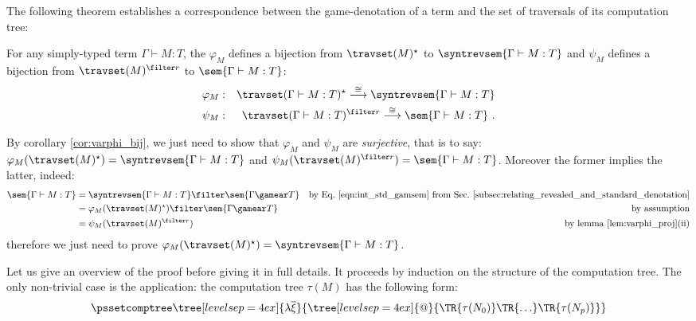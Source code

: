 The following theorem establishes a correspondence between the
game-denotation of a term and the set of traversals of its
computation tree:
\begin{theorem}
\label{thm:correspondence}
 For any simply-typed term $\Gamma \vdash M :T$,
the $\varphi_M$ defines a bijection from $\travset(M)^\star$ to $\syntrevsem{\Gamma \vdash M : T}$ and $\psi_M$ defines a bijection from $\travset(M)^{\filter
r}$ to $\sem{\Gamma \vdash M : T}$:
\begin{eqnarray*}
 \varphi_M  &:& \travset(\Gamma \vdash M : T)^\star \stackrel{\cong}{\longrightarrow} \syntrevsem{\Gamma \vdash M :T} \\
 \psi_M  &:& \travset(\Gamma \vdash M : T)^{\filter r} \stackrel{\cong}{\longrightarrow} \sem{\Gamma \vdash M :T} \ .
\end{eqnarray*}
\end{theorem}

\begin{remark}
\label{rem:corresp_proofreduction}
    By corollary \ref{cor:varphi_bij}, we just need to show that
    $\varphi_M$ and $\psi_M$ are \emph{surjective}, that is to
    say: $\varphi_M(\travset(M)^\star) = \syntrevsem{\Gamma \vdash M : T}$
    and $\psi_M(\travset(M)^{\filter r}) = \sem{\Gamma \vdash M : T}$.
    Moreover the former implies the latter, indeed:
    \begin{align*}
    \sem{\Gamma \vdash M : T} &= \syntrevsem{\Gamma \vdash M : T} \filter \sem{\Gamma \gamear T} & \mbox{by Eq.\ \ref{eqn:int_std_gamsem} from Sec.\ \ref{subsec:relating_revealed_and_standard_denotation}} \\
            &= \varphi_M(\travset(M)^\star) \filter \sem{\Gamma \gamear T} & \mbox{by assumption}\\
            &= \psi_M(\travset(M)^{\filter r}) & \mbox{by lemma \ref{lem:varphi_proj}(ii)}
    \end{align*}
    therefore we just need to prove $\varphi_M(\travset(M)^\star) = \syntrevsem{\Gamma \vdash M : T}$.
\end{remark}
\smallskip

    Let us give an overview of the proof before giving it in full details.
    It proceeds by induction on the structure of the computation tree.
    The only non-trivial case is the application: the computation tree
    $\tau(M)$ has the following form:
        $$ \pssetcomptree\tree[levelsep=4ex]{\lambda \overline{\xi}}
            { \tree[levelsep=4ex]{@}
                {   \TR{\tau(N_0)} \TR{\ldots} \TR{\tau(N_p)}}}
        $$

